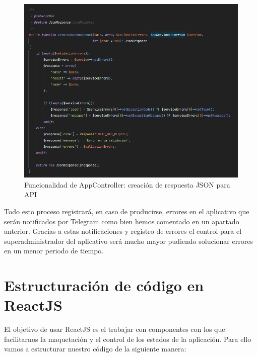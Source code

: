 \begin{figure}[H]
  \centering
  \includegraphics[scale=0.5]{images/create-json-response.png}
  \caption{Funcionalidad de AppController: creación de respuesta JSON para API}
  \label{}
\end{figure}

Todo esto proceso registrará, en caso de producirse, errores en el aplicativo que serán notificados por Telegram como bien hemos comentado en un apartado anterior. Gracias a estas notificaciones y registro de errores el control para el superadministrador del aplicativo será mucho mayor pudiendo solucionar errores en un menor periodo de tiempo.


\section{Estructuración de código en ReactJS}

El objetivo de usar ReactJS es el trabajar con componentes con los que facilitarnos la maquetación y el control de los estados de la aplicación. Para ello vamos a estructurar nuestro código de la siguiente manera:


